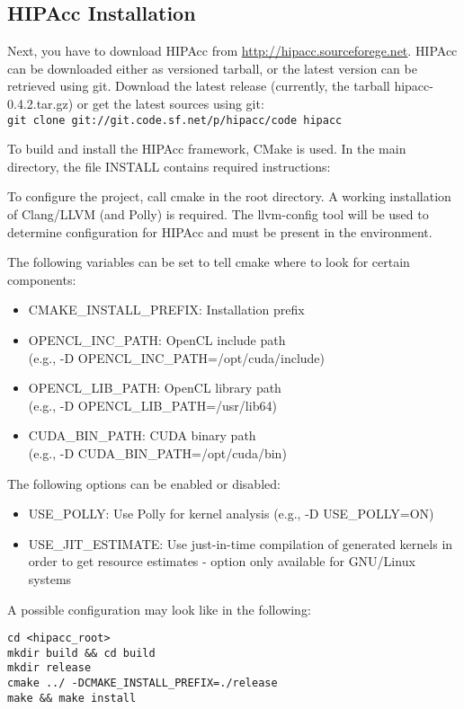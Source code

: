 \subsection{\ac{HIPAcc} Installation}
Next, you have to download \ac{HIPAcc} from
\href{http://hipacc.sourceforege.net}{http://hipacc.sourceforege.net}.
\ac{HIPAcc} can be downloaded either as versioned tarball, or the latest version
can be retrieved using git. Download the latest release (currently, the tarball
hipacc-0.4.2.tar.gz) or get the latest sources using git:\\
{\tt git clone git://git.code.sf.net/p/hipacc/code hipacc}

To build and install the \ac{HIPAcc} framework, CMake is used. In the main
directory, the file INSTALL contains required instructions:

To configure the project, call cmake in the root directory. A working
installation of Clang/LLVM (and Polly) is required. The llvm-config tool will be
used to determine configuration for \ac{HIPAcc} and must be present in the
environment.

The following variables can be set to tell cmake where to look for certain components:
\begin{itemize}
    \item CMAKE\_INSTALL\_PREFIX: Installation prefix
    \item OPENCL\_INC\_PATH: OpenCL include path\\(e.g., -D OPENCL\_INC\_PATH=/opt/cuda/include)
    \item OPENCL\_LIB\_PATH: OpenCL library path\\(e.g., -D OPENCL\_LIB\_PATH=/usr/lib64)
    \item CUDA\_BIN\_PATH:      CUDA binary path\\(e.g., -D CUDA\_BIN\_PATH=/opt/cuda/bin)
\end{itemize}

The following options can be enabled or disabled:
\begin{itemize}
    \item USE\_POLLY: Use Polly for kernel analysis (e.g., -D USE\_POLLY=ON)
    \item USE\_JIT\_ESTIMATE: Use just-in-time compilation of generated kernels
    in order to get resource estimates - option only available for GNU/Linux
    systems
\end{itemize}

A possible configuration may look like in the following:
\begin{lstlisting}
cd <hipacc_root>
mkdir build && cd build
mkdir release
cmake ../ -DCMAKE_INSTALL_PREFIX=./release
make && make install
\end{lstlisting}

